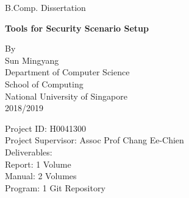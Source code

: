 \documentclass[12pt]{report}
\begin{document}
\begin{titlepage}
\begin{center}

B.Comp. Dissertation
\vspace{1cm}

{\large\textbf{Tools for Security Scenario Setup}}


\vspace{4cm}

By\\
Sun Mingyang\\
\vspace{2cm}
Department of Computer Science\\
\vspace{0.3cm}
School of Computing\\
\vspace{0.3cm}
National University of Singapore\\
\vspace{0.3cm}
2018/2019\\
\end{center}
	
\vfill

\begin{flushleft}
Project ID: H0041300\\
Project Supervisor: Assoc Prof Chang Ee-Chien\\
\vspace{0.5cm}
Deliverables:\\
\setlength{\parindent}{30pt}
Report: 1 Volume\\
Manual: 2 Volumes\\
Program: 1 Git Repository\\
\end{flushleft}
\end{titlepage}
\end{document}
